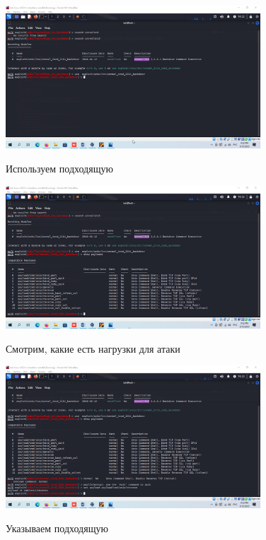 \documentclass[a4paper]{article}
\begin{document}
  \begin{figure}[H]
    \centering
    \includegraphics[width=0.85\textwidth]{04_0072}
    \label{img:71}
    \caption{Используем подходящую}
  \end{figure}

  \begin{figure}[H]
    \centering
    \includegraphics[width=0.85\textwidth]{04_0073}
    \label{img:72}
    \caption{Смотрим, какие есть нагрузки для атаки}
  \end{figure}

  \begin{figure}[H]
    \centering
    \includegraphics[width=0.85\textwidth]{04_0074}
    \label{img:73}
    \caption{Указываем подходящую}
  \end{figure}
\end{document}
